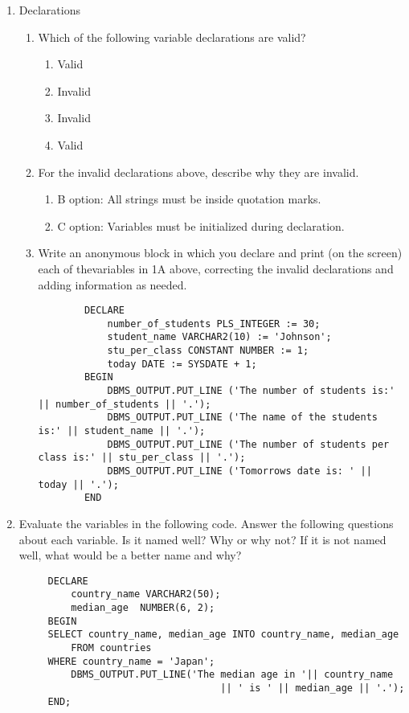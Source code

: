 \documentclass[11pt]{article}
\begin{document}
\begin{enumerate}
\item Declarations
\begin{enumerate}
\item Which of the following variable declarations are valid?
\begin{enumerate}
\item Valid
\item Invalid
\item Invalid
\item Valid
\end{enumerate}
\item For the invalid declarations above, describe why they are invalid.
\begin{enumerate}
\item B option: All strings must be inside quotation marks.
\item C option: Variables must be initialized during declaration.
\end{enumerate}
\item Write an anonymous block in which you declare and print (on the screen) each of thevariables in 1A above, correcting the invalid declarations and adding information as needed.
\begin{verbatim}
        DECLARE
            number_of_students PLS_INTEGER := 30;
            student_name VARCHAR2(10) := 'Johnson';
            stu_per_class CONSTANT NUMBER := 1;
            today DATE := SYSDATE + 1;
        BEGIN
            DBMS_OUTPUT.PUT_LINE ('The number of students is:' || number_of_students || '.');
            DBMS_OUTPUT.PUT_LINE ('The name of the students is:' || student_name || '.');
            DBMS_OUTPUT.PUT_LINE ('The number of students per class is:' || stu_per_class || '.');
            DBMS_OUTPUT.PUT_LINE ('Tomorrows date is: ' || today || '.');
        END
\end{verbatim}
\end{enumerate}
\item Evaluate the variables in the following code. Answer the following questions about each variable. Is it named well? Why or why not? If it is not named well, what would be a better name and why?
\begin{verbatim}
     DECLARE
         country_name VARCHAR2(50);
         median_age  NUMBER(6, 2);
     BEGIN
     SELECT country_name, median_age INTO country_name, median_age
         FROM countries
     WHERE country_name = 'Japan';
         DBMS_OUTPUT.PUT_LINE('The median age in '|| country_name
                                   || ' is ' || median_age || '.');
     END;
\end{verbatim}


\end{enumerate}
\end{document}
